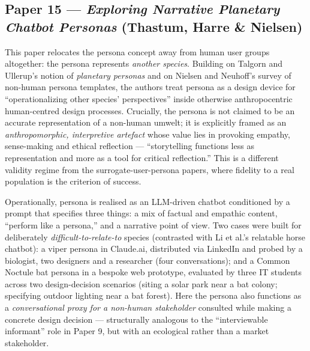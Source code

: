 
\subsection*{Paper 15 --- \emph{Exploring Narrative Planetary Chatbot Personas} (Thastum, Harre \& Nielsen)}

This paper relocates the persona concept away from human user groups altogether: the
persona represents \emph{another species}. Building on Talgorn and Ullerup's notion of
\emph{planetary personas} and on Nielsen and Neuhoff's survey of non-human persona
templates, the authors treat persona as a design device for ``operationalizing other
species' perspectives'' inside otherwise anthropocentric human-centred design processes.
Crucially, the persona is not claimed to be an accurate representation of a non-human
umwelt; it is explicitly framed as an \emph{anthropomorphic, interpretive artefact} whose
value lies in provoking empathy, sense-making and ethical reflection --- ``storytelling
functions less as representation and more as a tool for critical reflection.'' This is a
different validity regime from the surrogate-user-persona papers, where fidelity to a real
population is the criterion of success.

Operationally, persona is realised as an LLM-driven chatbot conditioned by a prompt that
specifies three things: a mix of factual and empathic content, ``perform like a persona,''
and a narrative point of view. Two cases were built for deliberately
\emph{difficult-to-relate-to} species (contrasted with Li et al.'s relatable horse
chatbot): a viper persona in Claude.ai, distributed via LinkedIn and probed by a
biologist, two designers and a researcher (four conversations); and a Common Noctule bat
persona in a bespoke web prototype, evaluated by three IT students across two
design-decision scenarios (siting a solar park near a bat colony; specifying outdoor
lighting near a bat forest). Here the persona also functions as a \emph{conversational
proxy for a non-human stakeholder} consulted while making a concrete design decision ---
structurally analogous to the ``interviewable informant'' role in Paper 9, but with an
ecological rather than a market stakeholder.

